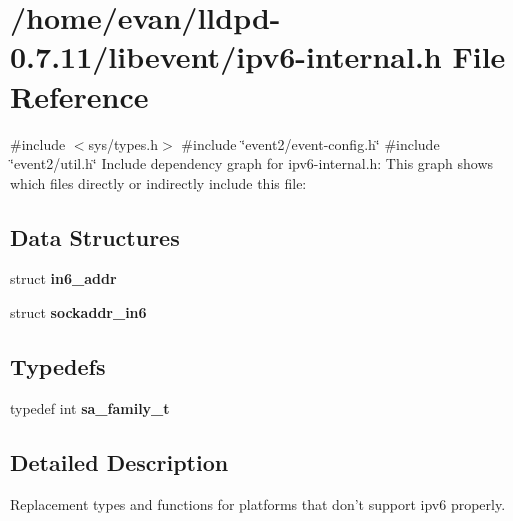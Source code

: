 \section{/home/evan/lldpd-\/0.7.11/libevent/ipv6-\/internal.h \-File \-Reference}
\label{ipv6-internal_8h}
{\ttfamily \#include $<$sys/types.\-h$>$}\*
{\ttfamily \#include \char`\"{}event2/event-\/config.\-h\char`\"{}}\*
{\ttfamily \#include \char`\"{}event2/util.\-h\char`\"{}}\*
\-Include dependency graph for ipv6-\/internal.h\-:
\-This graph shows which files directly or indirectly include this file\-:
\subsection*{\-Data \-Structures}
\begin{DoxyCompactItemize}
\item 
struct {\bf in6\-\_\-addr}
\item 
struct {\bf sockaddr\-\_\-in6}
\end{DoxyCompactItemize}
\subsection*{\-Typedefs}
\begin{DoxyCompactItemize}
\item 
typedef int {\bfseries sa\-\_\-family\-\_\-t}\label{ipv6-internal_8h_aec09f921171a6047ed8333dbd590fd4c}

\end{DoxyCompactItemize}


\subsection{\-Detailed \-Description}
\-Replacement types and functions for platforms that don't support ipv6 properly. 